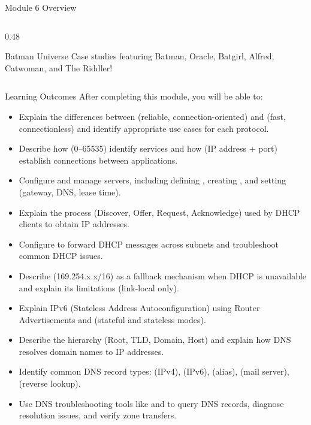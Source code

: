 \documentclass[aspectratio=169]{beamer}  %
\begin{document}
\begin{frame}{Module 6 Overview}
\begin{columns}[T]
\begin{column}{0.48\textwidth}
            \vspace{0.2em}
            \begin{exampleblock}{Batman Universe}
                \small
                Case studies featuring Batman, Oracle, Batgirl, Alfred, Catwoman, and The Riddler!
            \end{exampleblock}
        \end{column}
    \end{columns}
\end{frame}

\begin{frame}[t,allowframebreaks]{Learning Outcomes}
    After completing this module, you will be able to:
    \vspace{0.5em}
    \begin{itemize}
        \item Explain the differences between  (reliable, connection-oriented) and  (fast, connectionless) and identify appropriate use cases for each protocol.
        \item Describe how  (0--65535) identify services and how  (IP address + port) establish connections between applications.
        \item Configure and manage  servers, including defining , creating , and setting  (gateway, DNS, lease time).
        \item Explain the  process (Discover, Offer, Request, Acknowledge) used by DHCP clients to obtain IP addresses.
        \item Configure  to forward DHCP messages across subnets and troubleshoot common DHCP issues.
        \item Describe  (169.254.x.x/16) as a fallback mechanism when DHCP is unavailable and explain its limitations (link-local only).
        \item Explain IPv6  (Stateless Address Autoconfiguration) using Router Advertisements and  (stateful and stateless modes).
        \item Describe the  hierarchy (Root, TLD, Domain, Host) and explain how DNS resolves domain names to IP addresses.
        \item Identify common DNS record types:  (IPv4),  (IPv6),  (alias),  (mail server),  (reverse lookup).
        \item Use DNS troubleshooting tools like  and  to query DNS records, diagnose resolution issues, and verify zone transfers.
    \end{itemize}
\end{frame}
\end{document}
